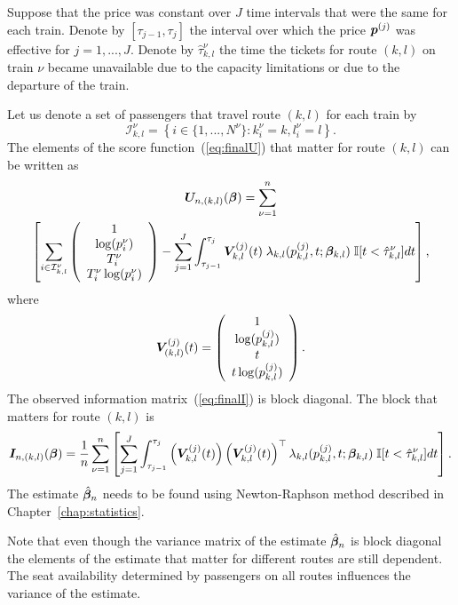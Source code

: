 Suppose that the price was constant over $J$ time intervals that were the same for each train. Denote by $[ \tau_{j-1}, \tau_j ]$ the interval over which the price $\bm{p}^{(j)}$ was effective for $j = 1, ..., J$. Denote by $\hat{\tau}_{k,l}^{\nu}$ the time the tickets for route $(k,l)$ on train $\nu$ became unavailable due to the capacity limitations or due to the departure of the train.

Let us denote a set of passengers that travel route $(k,l)$ for each train by
\[
	\mathcal{I}_{k,l}^{\nu} = \left\{ i \in \{ 1, ..., N^{\nu} \} : k_i^\nu = k, l_i^\nu = l \right\}.
\]
The elements of the score function~(\ref{eq:finalU}) that matter for route $(k,l)$ can be written as
\begin{multline*}
	\bm{U}_{n,(k,l)} (\bm{\beta})
	= \sum_{\nu=1}^{n} \\
	\left[ \sum_{i \in \mathcal{I}_{k,l}^{\nu}} \left(
		\begin{array}{c}
			1 \\ \log(p_i^\nu) \\ T_i^\nu \\ T_i^\nu \log(p_i^\nu)
		\end{array}
	\right) - 
	\sum_{j=1}^J \int_{\tau_{j-1}}^{\tau_j} \bm{V}_{k,l}^{(j)} (t) \; \lambda_{k,l} (p_{k,l}^{(j)}, t; \bm{\beta}_{k,l}) \; \mathbb{I} [t < \hat{\tau}_{k,l}^{\nu}] dt \right],
\end{multline*}
where
\[
	\bm{V}_{(k,l)}^{(j)} (t) = \left(
		\begin{array}{c}
			1 \\ \log(p_{k,l}^{(j)}) \\ t \\ t \log(p_{k,l}^{(j)})
		\end{array}
	\right).
\]
The observed information matrix~(\ref{eq:finalI}) is block diagonal. The block that matters for route $(k,l)$ is
\[
	\bm{I}_{n,(k,l)} (\bm{\beta}) = \frac{1}{n} \sum_{\nu=1}^{n} \left[
	\sum_{j=1}^J \int_{\tau_{j-1}}^{\tau_j}
	\left(\bm{V}_{k,l}^{(j)} (t)  \right)
	\left(\bm{V}_{k,l}^{(j)} (t)  \right)^{\top}
	\lambda_{k,l} (p_{k,l}^{(j)}, t; \bm{\beta}_{k,l})
	\; \mathbb{I} [t < \hat{\tau}_{k,l}^{\nu}] dt \right].
\]
The estimate $\hat{\bm{\beta}}_n$ needs to be found using Newton-Raphson method described in Chapter~\ref{chap:statistics}.

Note that even though the variance matrix of the estimate $\hat{\bm{\beta}}_n$ is block diagonal the elements of the estimate that matter for different routes are still dependent. The seat availability determined by passengers on all routes influences the variance of the estimate.

